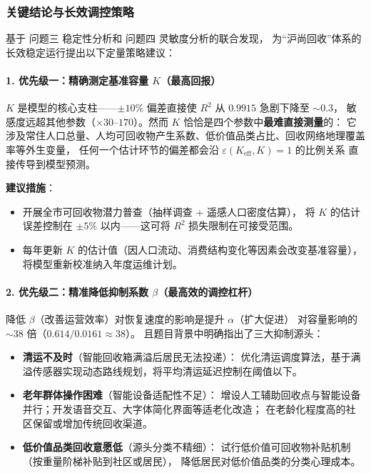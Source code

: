 \documentclass[12pt,a4paper]{ctexart}
\begin{document}
\subsubsection{关键结论与长效调控策略}

基于 问题三 稳定性分析和 问题四 灵敏度分析的联合发现，
为``沪尚回收''体系的长效稳定运行提出以下定量策略建议：

\paragraph*{1. 优先级一：精确测定基准容量 $K$（最高回报）}

$K$ 是模型的核心支柱——$\pm 10\%$ 偏差直接使 $R^2$ 从 $0.9915$ 急剧下降至 $\sim 0.3$，
敏感度远超其他参数（$\times 30$--$170$）。然而 $K$ 恰恰是四个参数中\textbf{最难直接测量}的：
它涉及常住人口总量、人均可回收物产生系数、低价值品类占比、回收网络地理覆盖率等外生变量，
任何一个估计环节的偏差都会沿 $\varepsilon(K_{\text{eff}}, K) = 1$ 的比例关系
直接传导到模型预测。

\textbf{建议措施}：
\begin{itemize}
  \item 开展全市可回收物潜力普查（抽样调查 + 遥感人口密度估算），
        将 $K$ 的估计误差控制在 $\pm 5\%$ 以内——这可将 $R^2$ 损失限制在可接受范围。
  \item 每年更新 $K$ 的估计值（因人口流动、消费结构变化等因素会改变基准容量），
        将模型重新校准纳入年度运维计划。
\end{itemize}

\paragraph*{2. 优先级二：精准降低抑制系数 $\beta$（最高效的调控杠杆）}

降低 $\beta$（改善运营效率）对恢复速度的影响是提升 $\alpha$（扩大促进）
对容量影响的 $\sim 38$ 倍（$0.614 / 0.0161 \approx 38$）。
且题目背景中明确指出了三大抑制源头：

\begin{itemize}
  \item \textbf{清运不及时}（智能回收箱满溢后居民无法投递）：
        优化清运调度算法，基于满溢传感器实现动态路线规划，将平均清运延迟控制在阈值以下。
  \item \textbf{老年群体操作困难}（智能设备适配性不足）：
        增设人工辅助回收点与智能设备并行；开发语音交互、大字体简化界面等适老化改造；
        在老龄化程度高的社区保留或增加传统回收渠道。
  \item \textbf{低价值品类回收意愿低}（源头分类不精细）：
        试行低价值可回收物补贴机制（按重量阶梯补贴到社区或居民），
        降低居民对低价值品类的分类心理成本。
\end{itemize}
\end{document}
